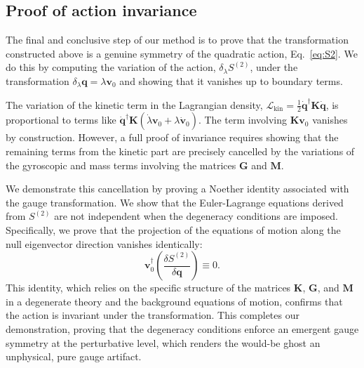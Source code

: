 \documentclass[twocolumn]{aastex631}
\begin{document}
\subsection{Proof of action invariance}
The final and conclusive step of our method is to prove that the transformation constructed above is a genuine symmetry of the quadratic action, Eq.~\eqref{eq:S2}. We do this by computing the variation of the action, $\delta_\lambda S^{(2)}$, under the transformation $\delta_\lambda \mathbf{q} = \lambda \mathbf{v}_0$ and showing that it vanishes up to boundary terms.

The variation of the kinetic term in the Lagrangian density, $\mathcal{L}_{\text{kin}} = \frac{1}{2} \dot{\mathbf{q}}^\dagger \mathbf{K} \dot{\mathbf{q}}$, is proportional to terms like $\dot{\mathbf{q}}^\dagger \mathbf{K} (\dot{\lambda}\mathbf{v}_0 + \lambda \dot{\mathbf{v}}_0)$. The term involving $\mathbf{K}\mathbf{v}_0$ vanishes by construction. However, a full proof of invariance requires showing that the remaining terms from the kinetic part are precisely cancelled by the variations of the gyroscopic and mass terms involving the matrices $\mathbf{G}$ and $\mathbf{M}$.

We demonstrate this cancellation by proving a Noether identity associated with the gauge transformation. We show that the Euler-Lagrange equations derived from $S^{(2)}$ are not independent when the degeneracy conditions are imposed. Specifically, we prove that the projection of the equations of motion along the null eigenvector direction vanishes identically:
\begin{equation}
\mathbf{v}_0^\dagger \left( \frac{\delta S^{(2)}}{\delta \mathbf{q}} \right) \equiv 0.
\end{equation}
This identity, which relies on the specific structure of the matrices $\mathbf{K}$, $\mathbf{G}$, and $\mathbf{M}$ in a degenerate theory and the background equations of motion, confirms that the action is invariant under the transformation. This completes our demonstration, proving that the degeneracy conditions enforce an emergent gauge symmetry at the perturbative level, which renders the would-be ghost an unphysical, pure gauge artifact.
\end{document}
